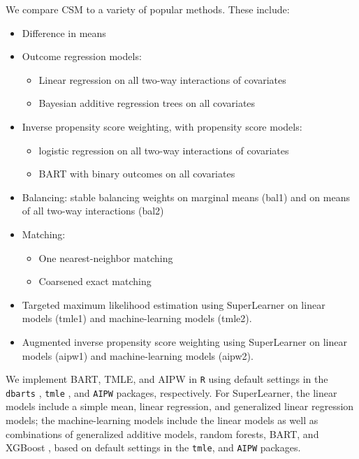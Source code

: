 \documentclass{article}
\begin{document}
We compare CSM to a variety of popular methods.
These include:
\begin{itemize}
    \item Difference in means
    \item Outcome regression models: 
    \begin{itemize}
        \item Linear regression on all two-way interactions of covariates
        \item Bayesian additive regression trees \citep[BART][]{chipman2009bart} on all covariates 
    \end{itemize}
    \item Inverse propensity score weighting, with propensity score models:
    \begin{itemize}
        \item logistic regression on all two-way interactions of covariates
        \item BART with binary outcomes on all covariates
    \end{itemize}
    \item Balancing: stable balancing weights \citep{zubizarreta2015stable} on marginal means (bal1) and on means of all two-way interactions (bal2)
    \item Matching:
    \begin{itemize}
        \item One nearest-neighbor matching
        \item Coarsened exact matching \citep{iacus2012causal}
    \end{itemize}
    \item Targeted maximum likelihood estimation \citep[TMLE; ][]{van2006targeted} using SuperLearner \citep{van2007super} on linear models (tmle1) and machine-learning models (tmle2).
    \item Augmented inverse propensity score weighting \citep[AIPW; ][]{robins1994estimation} using SuperLearner on linear models (aipw1) and machine-learning models (aipw2).
\end{itemize}

We implement BART, TMLE, and AIPW in \texttt{R} using default settings in the \texttt{dbarts} \citep{dorie2023dbarts}, \texttt{tmle} \citep{gruber2012tmle}, and \texttt{AIPW} \citep{zhong2021aipw} packages, respectively.
For SuperLearner, the linear models include a simple mean, linear regression, and generalized linear regression models; the machine-learning models include the linear models as well as combinations of generalized additive models, random forests, BART, and XGBoost \citep{chen2016xgboost}, based on default settings in the \texttt{tmle}, and \texttt{AIPW} packages.
\end{document}
